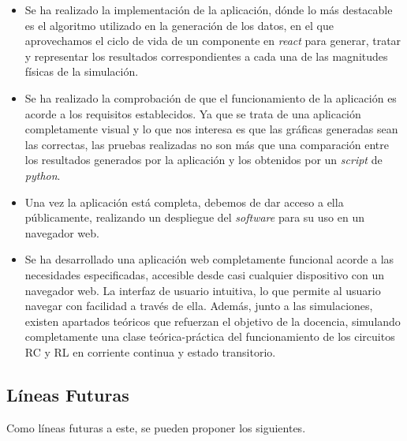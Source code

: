 \documentclass[../main.tex]{subfiles}
\begin{document}
\begin{itemize}
    \item Se ha realizado la implementación de la aplicación, dónde lo más destacable es el algoritmo utilizado en la generación de los datos, en el que aprovechamos el ciclo de vida de un componente en \textit{react} para generar, tratar y representar los resultados correspondientes a cada una de las magnitudes físicas de la simulación. 
    
    \item Se ha realizado la comprobación de que el funcionamiento de la aplicación es acorde a los requisitos establecidos. Ya que se trata de una aplicación completamente visual y lo que nos interesa es que las gráficas generadas sean las correctas, las pruebas realizadas no son más que una comparación entre los resultados generados por la aplicación y los obtenidos por un \textit{script} de \textit{python}. 
    
    
    \item Una vez la aplicación está completa, debemos de dar acceso a ella públicamente, realizando un despliegue del \textit{software} para su uso en un navegador web.
    
    \item Se ha desarrollado una aplicación web completamente funcional acorde a las necesidades especificadas, accesible desde casi cualquier dispositivo con un navegador web. La interfaz de usuario intuitiva, lo que permite al usuario navegar con facilidad a través de ella. Además, junto a las simulaciones, existen apartados teóricos que refuerzan el objetivo de la docencia, simulando completamente una clase teórica-práctica del funcionamiento de los circuitos RC y RL en corriente continua y estado transitorio.
    
\end{itemize}






\subsection{Líneas Futuras}
Como líneas futuras a este, se pueden proponer los siguientes.
\end{document}
